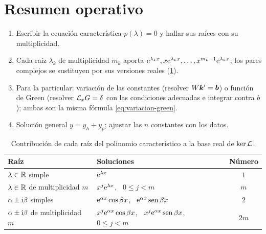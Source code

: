 \section{Resumen operativo}\label{sec:resumen}

\begin{metodo}[{Resolución de $\Lop[y]=b$ con coeficientes constantes}]
\begin{enumerate}[label=\textcolor{ambar}{\bfseries\arabic*.}, leftmargin=1.6em]
  \item Escribir la ecuación característica $p(\lambda)=0$ y hallar sus
        raíces con su multiplicidad.
  \item Cada raíz $\lambda_k$ de multiplicidad $m_k$ aporta
        $\mathrm{e}^{\lambda_kx},x\mathrm{e}^{\lambda_kx},\dots,x^{m_k-1}\mathrm{e}^{\lambda_kx}$; los
        pares complejos se sustituyen por sus versiones reales
        (\cref{tab:base}).
  \item Para la particular: variación de las constantes (resolver
        $W\bm{k}'=\bm{b}$) o función de Green (resolver $\mathcal{L}_xG=\delta$ con las
        condiciones adecuadas e integrar contra $b$); ambas son la misma
        fórmula \eqref{eq:variacion-green}.
  \item Solución general $y=y_h+y_p$; ajustar las $n$ constantes con los
        datos.
\end{enumerate}
\end{metodo}

\begin{table}[!htb]
\centering
\caption{Contribución de cada raíz del polinomio característico a la base
real de $\operatorname{ker}\mathcal{L}$.}
\label{tab:base}
\renewcommand{\arraystretch}{1.5}
\small
\begin{tabular}{@{}l l c@{}}
\toprule
\textcolor{cian}{\bfseries Raíz} & \textcolor{cian}{\bfseries Soluciones} &
\textcolor{cian}{\bfseries Número}\\
\midrule
$\lambda\in\mathbb{R}$ simple & $\mathrm{e}^{\lambda x}$ & $1$\\
$\lambda\in\mathbb{R}$ de multiplicidad $m$ & $x^{j}\mathrm{e}^{\lambda x}$, \ $0\le j<m$ & $m$\\
$\alpha\pm\mathrm{i}\beta$ simples & $\mathrm{e}^{\alpha x}\cos\beta x$, \ $\mathrm{e}^{\alpha x}\operatorname{sen}\beta x$ & $2$\\
$\alpha\pm\mathrm{i}\beta$ de multiplicidad $m$ & $x^{j}\mathrm{e}^{\alpha x}\cos\beta x$, \ $x^{j}\mathrm{e}^{\alpha x}\operatorname{sen}\beta x$, \ $0\le j<m$ & $2m$\\
\bottomrule
\end{tabular}
\end{table}

